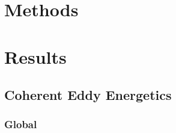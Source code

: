\documentclass[draft]{agujournal2019}
\begin{document}
	\section{Methods}
	\label{sec:Methods}
	
	
	\section{Results}
	\label{sec:Results}
	
	\subsection{Coherent Eddy Energetics}
	\label{subsec:R_season}
	
	\subsubsection{Global}
\end{document}
